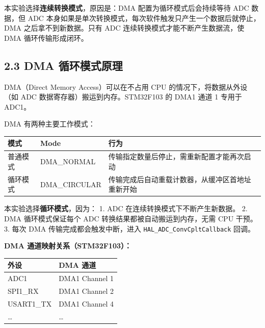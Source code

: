 \documentclass[
  chinese,
  UTF8,
  oneside,
  openany]{ctexbook}
\begin{document}
本实验选择\textbf{连续转换模式}，原因是：DMA 配置为循环模式后会持续等待
ADC 数据，但 ADC
本身如果是单次转换模式，每次软件触发只产生一个数据后就停止，DMA
之后拿不到新数据。只有 ADC 连续转换模式才能不断产生数据流，使 DMA
循环传输形成闭环。

\subsection{2.3 DMA
循环模式原理}\label{dma-ux5faaux73afux6a21ux5f0fux539fux7406}

DMA（Direct Memory Access）可以在不占用 CPU 的情况下，将数据从外设（如
ADC 数据寄存器）搬运到内存。STM32F103 的 DMA1 通道 1 专用于 ADC1。

DMA 有两种主要工作模式：

\begin{longtable}[]{@{}
  >{\raggedright\arraybackslash}p{}
  >{\raggedright\arraybackslash}p{}
  >{\raggedright\arraybackslash}p{}@{}}
\toprule\noalign{}
\begin{minipage}[b]{\linewidth}\raggedright
模式
\end{minipage} & \begin{minipage}[b]{\linewidth}\raggedright
Mode
\end{minipage} & \begin{minipage}[b]{\linewidth}\raggedright
行为
\end{minipage} \\
\midrule\noalign{}
\endhead
\bottomrule\noalign{}
\endlastfoot
普通模式 & DMA\_NORMAL & 传输指定数量后停止，需重新配置才能再次启动 \\
循环模式 & DMA\_CIRCULAR &
传输完成后自动重载计数器，从缓冲区首地址重新开始 \\
\end{longtable}

本实验选择\textbf{循环模式}，因为： 1. ADC
在连续转换模式下不断产生新数据。 2. DMA 循环模式保证每个 ADC
转换结果都被自动搬运到内存，无需 CPU 干预。 3. 每次 DMA
传输完成都会触发中断，进入 \texttt{HAL\_ADC\_ConvCpltCallback} 回调。

\textbf{DMA 通道映射关系（STM32F103）：}

\begin{longtable}[]{@{}ll@{}}
\toprule\noalign{}
外设 & DMA 通道 \\
\midrule\noalign{}
\endhead
\bottomrule\noalign{}
\endlastfoot
ADC1 & DMA1 Channel 1 \\
SPI1\_RX & DMA1 Channel 2 \\
USART1\_TX & DMA1 Channel 4 \\
\ldots{} & \ldots{} \\
\end{longtable}
\end{document}
